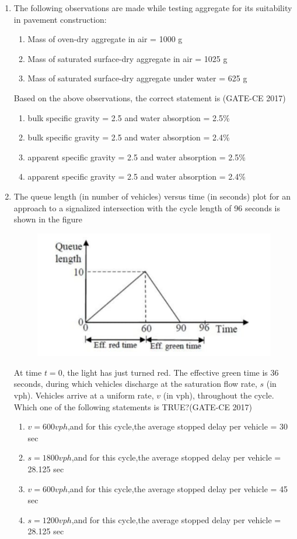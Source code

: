 \documentclass[journal,12pt,onecolumn]{article}
\theoremstyle{remark}
\begin{document}
\begin{enumerate}
    \item The following observations are made while testing aggregate for its suitability in pavement construction:
    \begin{enumerate}
        \item Mass of oven-dry aggregate in air = 1000 g
        \item Mass of saturated surface-dry aggregate in air = 1025 g
        \item Mass of saturated surface-dry aggregate under water = 625 g
    \end{enumerate}
    Based on the above observations, the correct statement is \underline{\hspace{3cm}}\hfill (GATE-CE 2017)
    \begin{enumerate}
        \item bulk specific gravity = 2.5 and water absorption = 2.5\%
        \item bulk specific gravity = 2.5 and water absorption = 2.4\%
        \item apparent specific gravity = 2.5 and water absorption = 2.5\%
        \item apparent specific gravity = 2.5 and water absorption = 2.4\%
    \end{enumerate}

    \item The queue length (in number of vehicles) versus time (in seconds) plot for an approach to a signalized intersection with the cycle length of 96 seconds is shown in the figure 
    \begin{figure}[H]
    \centering
    \includegraphics[width=0.7\columnwidth]{imageq33.jpg}  
    \caption{}
    \label{fig:33}
    \end{figure}
    At time $t = 0$, the light has just turned red. The effective green time is 36 seconds, during which vehicles discharge at the saturation flow rate, $s$ (in vph). Vehicles arrive at a uniform rate, $v$ (in vph), throughout the cycle. Which one of the following statements is TRUE?\hfill (GATE-CE 2017)
    \begin{enumerate}
        \item $v = 600 vph$,and for this cycle,the average stopped delay per vehicle = 30 sec
        \item $s = 1800 vph$,and for this cycle,the average stopped delay per vehicle = 28.125 sec
        \item $v = 600 vph$,and for this cycle,the average stopped delay per vehicle = 45 sec
        \item $s = 1200 vph$,and for this cycle,the average stopped delay per vehicle = 28.125 sec
    \end{enumerate}


\end{enumerate}
\end{document}

